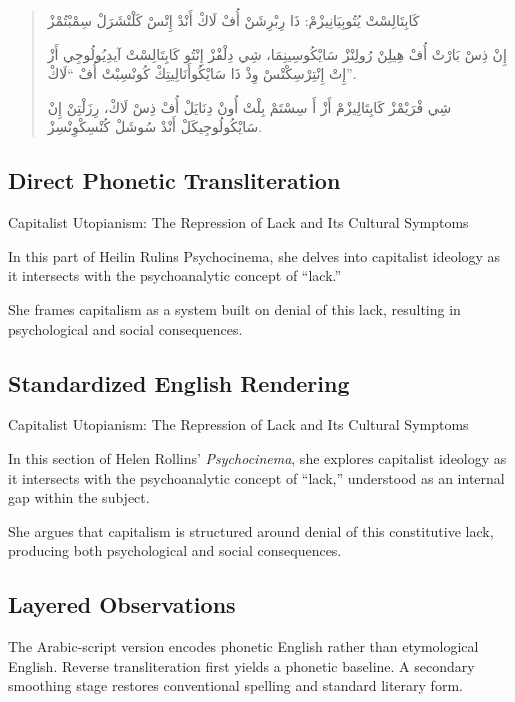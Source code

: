 \documentclass[12pt]{article}
\newcommand{\AR}[1]{\foreignlanguage{arabic}{#1}}
\begin{document}
\begin{quote}
\AR{كَابِتَالِسْتْ يُتُوبِيَانِيزْمْ: ذَا رِبْرِشَنْ أُفْ لَاكْ أَنْدْ إِتْسْ كَلْتْشَرَلْ سِمْبْتُمْزْ}

\AR{إِنْ ذِسْ بَارْتْ أُفْ هِيلِنْ رُولِنْزْ سَايْكُوسِينِمَا، شِي دِلْفْزْ إِنْتُو كَابِتَالِسْتْ آيدِيُولُوجِي أَزْ إِتْ إِنْتِرْسِكْتْسْ وِذْ ذَا سَايْكُوأَنَالِيتِكْ كُونْسِبْتْ أُفْ ``لَاكْ''.}

\AR{شِي فْرَيْمْزْ كَابِتَالِيزْمْ أَزْ أَ سِسْتَمْ بِلْتْ أُونْ دِنَايَلْ أُفْ ذِسْ لَاكْ، رِزَلْتِنْ إِنْ سَايْكُولُوجِيكَلْ أَنْدْ سُوشَلْ كُنْسِكْوِنْسِزْ.}
\end{quote}

\subsection{Direct Phonetic Transliteration}

Capitalist Utopianism: The Repression of Lack and Its Cultural Symptoms

In this part of Heilin Rulins Psychocinema, she delves into capitalist ideology as it intersects with the psychoanalytic concept of “lack.”

She frames capitalism as a system built on denial of this lack, resulting in psychological and social consequences.

\subsection{Standardized English Rendering}

Capitalist Utopianism: The Repression of Lack and Its Cultural Symptoms

In this section of Helen Rollins’ \emph{Psychocinema}, she explores capitalist ideology as it intersects with the psychoanalytic concept of “lack,” understood as an internal gap within the subject.

She argues that capitalism is structured around denial of this constitutive lack, producing both psychological and social consequences.

\subsection{Layered Observations}

The Arabic-script version encodes phonetic English rather than etymological English. Reverse transliteration first yields a phonetic baseline. A secondary smoothing stage restores conventional spelling and standard literary form.
\end{document}
